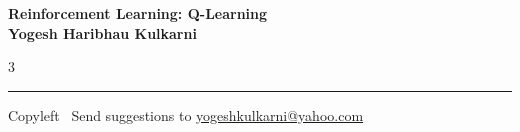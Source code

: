 \documentclass[8pt,landscape]{article}
\begin{document}
\footnotesize


\begin{center}
\Large{\textbf{Reinforcement Learning: Q-Learning\\ Yogesh Haribhau Kulkarni}}
\end{center}

\begin{multicols}{3}

\end{multicols}

\rule{\linewidth}{0.25pt}
\scriptsize
Copyleft \textcopyleft\  Send suggestions to
\href{http://www.yogeshkulkarni.com}{yogeshkulkarni@yahoo.com}
\end{document}
